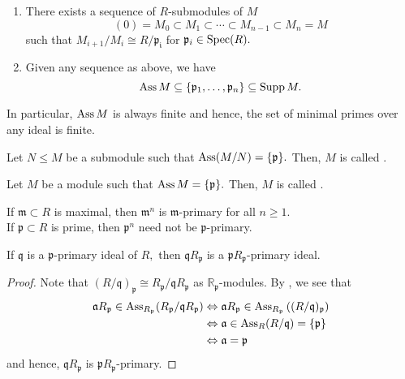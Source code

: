 \documentclass[12pt]{article}	%
\begin{document}
\begin{thm}
	\begin{enumerate}
		\item There exists a sequence of $R$-submodules of $M$
		\begin{equation*} 
			(0) = M_0 \subset M_1 \subset \cdots \subset M_{n-1} \subset M_n = M
		\end{equation*}
		such that $M_{i+1}/M_i \cong R/\mathfrak{p_i}$ for $\mathfrak{p}_i \in \operatorname{Spec}(R).$
		\item Given any sequence as above, we have
		\begin{equation*} 
			\operatorname{Ass} M \subseteq \{\mathfrak{p}_1, \ldots, \mathfrak{p}_n\} \subseteq \operatorname{Supp} M.
		\end{equation*}
	\end{enumerate}
	In particular, $\operatorname{Ass} M$ is always finite and hence, the set of minimal primes over any ideal is finite.
\end{thm}

\begin{defn}%
	Let $N \le M$ be a submodule such that $\operatorname{Ass}(M/N) = \{\mathfrak{p}\}.$ Then, $M$ is called .
\end{defn}
\begin{defn}%
	Let $M$ be a module such that $\operatorname{Ass} M = \{\mathfrak{p}\}.$ Then, $M$ is called .
\end{defn}

\begin{ex}
	If $\mathfrak{m} \subset R$ is maximal, then $\mathfrak{m}^n$ is $\mathfrak{m}$-primary for all $n \ge 1.$\\
	If $\mathfrak{p} \subset R$ is prime, then $\mathfrak{p}^n$ need not be $\mathfrak{p}$-primary.
\end{ex}

\begin{prop}
	If $\mathfrak{q}$ is a $\mathfrak{p}$-primary ideal of $R,$ then $\mathfrak{q}R_{\mathfrak{p}}$ is a $\mathfrak{p}R_{\mathfrak{p}}$-primary ideal.
\end{prop}
\begin{proof} 
	Note that $(R/\mathfrak{q})_{\mathfrak{p}} \cong R_{\mathfrak{p}}/\mathfrak{q}R_{\mathfrak{p}}$ as $\mathbb{R}_{\mathfrak{p}}$-modules. By , we see that
	\begin{align*} 
		\mathfrak{a}R_{\mathfrak{p}} \in \operatorname{Ass}_{R_{\mathfrak{p}}}(R_{\mathfrak{p}}/\mathfrak{q}R_{\mathfrak{p}}) &\Leftrightarrow \mathfrak{a}R_{\mathfrak{p}} \in \operatorname{Ass}_{R_{\mathfrak{p}}}\left((R/\mathfrak{q})_{\mathfrak{p}}\right)\\
		&\Leftrightarrow \mathfrak{a} \in \operatorname{Ass}_R(R/\mathfrak{q}) = \{\mathfrak{p}\}\\
		&\Leftrightarrow \mathfrak{a} = \mathfrak{p}
	\end{align*}
	and hence, $\mathfrak{q}R_{\mathfrak{p}}$ is $\mathfrak{p}R_{\mathfrak{p}}$-primary.
\end{proof}
\end{document}
